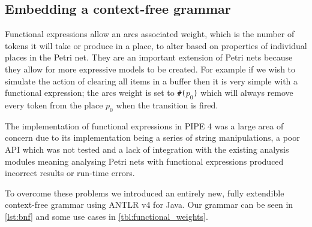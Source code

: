 \subsection{Embedding a context-free grammar}
Functional expressions allow an arcs associated weight, which is the number of tokens it will take or produce in a place, to alter based on properties of individual places in the Petri net. They are an important extension of Petri nets because they allow for more expressive models to be created. For example if we wish to simulate the action of clearing all items in a buffer then it is very simple with a functional expression; the arcs weight is set to \texttt{\#($p_0$)} which will always remove every token from the place $p_0$ when the transition is fired.

The implementation of functional expressions in PIPE 4 was a large area of concern due to its implementation being a series of string manipulations, a poor API which was not tested and a lack of integration with the existing analysis modules meaning analysing Petri nets with functional expressions produced incorrect results or run-time errors.
% 

To overcome these problems we introduced an entirely new, fully extendible context-free grammar using ANTLR v4 for Java. Our grammar can be seen in \cref{lst:bnf} and some use cases in \cref{tbl:functional_weights}.

